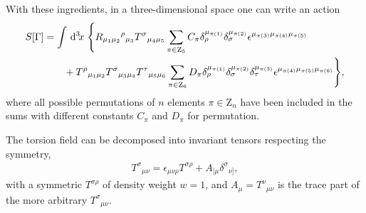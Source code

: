 \documentclass[%
  showpacs,showkeys,prd,superscriptaddress]{revtex4-1}
\begin{document}
With these ingredients, in a three-dimensional space one can write an action 
\begin{align}
  \label{accion3d}
  S[\Gamma] &=
  \int \,{\mathrm{d}}^{3}\!{x}\; \Bigg\{R_{\mu_1\mu_2}{}^\rho{}_{\mu_3} T^\sigma{}_{\mu_4\mu_5}\sum_{\pi \in  \mathrm{Z}_5}C_\pi\delta_\rho^{\mu_{\pi(1)}} \delta_\sigma^{\mu_{\pi(2)}}\epsilon^{\mu_{\pi(3)}\mu_{\pi(4)}\mu_{\pi(5)}} \notag\\ 
  & \qquad + T^\rho{}_{\mu_1\mu_2} T^\sigma{}_{\mu_3\mu_4}T^\tau{}_{\mu_5\mu_6} \sum_{\pi \in \mathrm{Z}_6}D_\pi\delta_\rho^{\mu_{\pi(1)}} \delta_\sigma^{\mu_{\pi(2)}}\delta_\tau^{\mu_{\pi(3)}}\epsilon^{\mu_{\pi(4)}\mu_{\pi(5)}\mu_{\pi(6)}}\Bigg\}, 
\end{align}
where all possible permutations of $n$ elements $\pi\in\mathrm{Z}_n$ have been included in the sums with  different constants $C_\pi$ and $D_\pi$ for  permutation. %

The torsion field can be decomposed into invariant tensors respecting the symmetry,
\begin{align}
  T^\sigma{}_{\mu\nu}=\epsilon_{\mu\nu\rho} T^{\sigma\rho}+A_{[\mu}\delta^\sigma{}_{\nu]},
\end{align}
with a symmetric $T^{\sigma\rho}$ of density weight  $w =1$, and $A_\mu=T^\nu{}_{\mu\nu}$ is the trace part of the more arbitrary $T^\sigma{}_{\mu\nu}$.
\end{document}
